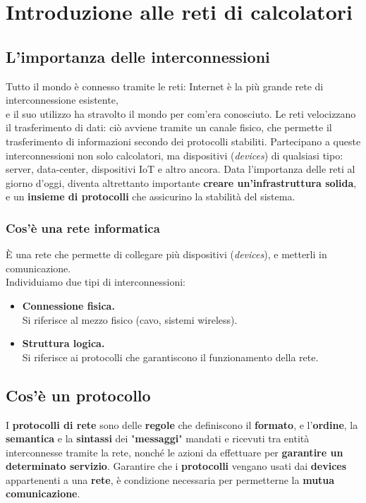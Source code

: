 \chapter{Introduzione alle reti di calcolatori}

\section{L'importanza delle interconnessioni}
Tutto il mondo è connesso tramite le reti: Internet è la più grande rete di interconnessione esistente,\\ e il suo utilizzo ha stravolto il mondo per com'era conosciuto. 
Le reti velocizzano il trasferimento di dati: ciò avviene tramite un canale fisico, che permette il trasferimento di informazioni secondo dei protocolli stabiliti. Partecipano a queste interconnessioni non solo calcolatori, ma dispositivi (\textit{devices}) di qualsiasi tipo: server, data-center, dispositivi IoT e altro ancora. Data l'importanza delle reti al giorno d'oggi, diventa altrettanto importante \textbf{creare un'infrastruttura solida}, e un \textbf{insieme di protocolli} che assicurino la stabilità del sistema.

\subsection{Cos'è una rete informatica}
È una rete che permette di collegare più dispositivi (\textit{devices}), e metterli in comunicazione.\\
Individuiamo due tipi di interconnessioni:
\begin{itemize}
    \item \textbf{Connessione fisica.}\\
    Si riferisce al mezzo fisico (cavo, sistemi wireless).
    \item \textbf{Struttura logica.}\\
    Si riferisce ai protocolli che garantiscono il funzionamento della rete.
\end{itemize}

\newpage

\section{Cos'è un protocollo}\label{1.2.1}
I \textbf{protocolli di rete} sono delle \textbf{regole} che definiscono il \textbf{formato}, e l'\textbf{ordine}, la \textbf{semantica} e la \textbf{sintassi} dei "\textbf{messaggi}" mandati e ricevuti tra entità interconnesse tramite la rete, nonché le azioni da effettuare per \textbf{garantire un determinato servizio}. Garantire che i \textbf{protocolli} vengano usati dai \textbf{devices} appartenenti a una \textbf{rete}, è condizione necessaria per permetterne la \textbf{mutua comunicazione}.

